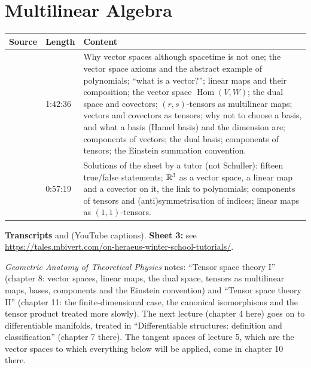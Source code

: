 \chapter{Multilinear Algebra}\label{ch:c03}
\begin{paracol}{2}

\begin{sources}
\begin{tabularx}{\linewidth}{@{}l l L@{}}
\toprule
\textbf{Source} & \textbf{Length} & \textbf{Content}\\
\midrule
{} & 1:42:36 & Why vector spaces although spacetime is not one; the vector space axioms and the abstract example of polynomials; ``what is a vector?'';
linear maps and their composition; the vector space $\operatorname{Hom}(V,W)$; the dual space and covectors; $(r,s)$-tensors as multilinear maps; vectors and covectors as tensors;
why not to choose a basis, and what a basis (Hamel basis) and the dimension are; components of vectors; the dual basis; components of tensors; the Einstein summation convention.\\
 & 0:57:19 & Solutions of the sheet by a tutor (not Schuller): fifteen true/false statements; $\mathbb{R}^3$ as a vector space, a linear map and a covector on it,
the link to polynomials; components of tensors and (anti)symmetrisation of indices; linear maps as $(1,1)$-tensors.\\
\bottomrule
\end{tabularx}

\smallskip
\textbf{Transcripts}  and  (YouTube captions).
\textbf{Sheet 3:} see \url{https://tales.mbivert.com/on-heraeus-winter-school-tutorials/}.
\end{sources}

\begin{reading}
\emph{Geometric Anatomy of Theoretical Physics} notes: ``Tensor space theory I'' (chapter 8: vector spaces, linear maps, the dual space, tensors as multilinear maps, bases,
components and the Einstein convention) and ``Tensor space theory II'' (chapter 11: the finite-dimensional case, the canonical isomorphisms and the tensor product treated
more slowly). The next lecture (chapter 4 here) goes on to differentiable manifolds, treated in ``Differentiable structures: definition and classification'' (chapter 7 there).
The tangent spaces of lecture 5, which are the vector spaces to which everything below will be applied, come in chapter 10 there.
\end{reading}


\end{paracol}
